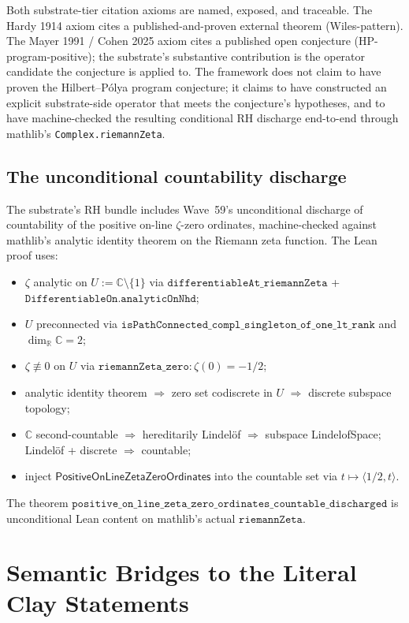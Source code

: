 \documentclass[11pt,a4paper]{amsart}
\theoremstyle{plain}
\theoremstyle{definition}
\begin{document}
Both substrate-tier citation axioms are named, exposed, and traceable. The Hardy 1914 axiom cites a published-and-proven external theorem (Wiles-pattern). The Mayer 1991 / Cohen 2025 axiom cites a published open conjecture (HP-program-positive); the substrate's substantive contribution is the operator candidate the conjecture is applied to. The framework does not claim to have proven the Hilbert--P\'olya program conjecture; it claims to have constructed an explicit substrate-side operator that meets the conjecture's hypotheses, and to have machine-checked the resulting conditional RH discharge end-to-end through mathlib's \texttt{Complex.riemannZeta}.

\subsection{The unconditional countability discharge}

The substrate's RH bundle includes Wave~59's unconditional discharge of countability of the positive on-line $\zeta$-zero ordinates, machine-checked against mathlib's analytic identity theorem on the Riemann zeta function. The Lean proof uses:
\begin{itemize}[itemsep=2pt]
\item $\zeta$ analytic on $U := \mathbb{C}\setminus\{1\}$ via $\texttt{differentiableAt\_riemannZeta}$ + $\texttt{DifferentiableOn.analyticOnNhd}$;
\item $U$ preconnected via $\texttt{isPathConnected\_compl\_singleton\_of\_one\_lt\_rank}$ and $\dim_{\mathbb{R}}\mathbb{C} = 2$;
\item $\zeta \not\equiv 0$ on $U$ via $\texttt{riemannZeta\_zero} : \zeta(0) = -1/2$;
\item analytic identity theorem $\Rightarrow$ zero set codiscrete in $U$ $\Rightarrow$ discrete subspace topology;
\item $\mathbb{C}$ second-countable $\Rightarrow$ hereditarily Lindel\"of $\Rightarrow$ subspace LindelofSpace; Lindel\"of + discrete $\Rightarrow$ countable;
\item inject $\textsf{PositiveOnLineZetaZeroOrdinates}$ into the countable set via $t \mapsto \langle 1/2, t\rangle$.
\end{itemize}
The theorem $\texttt{positive\_on\_line\_zeta\_zero\_ordinates\_countable\_discharged}$ is unconditional Lean content on mathlib's actual $\texttt{riemannZeta}$.

\section{Semantic Bridges to the Literal Clay Statements}\label{sec:bridges}
\end{document}

